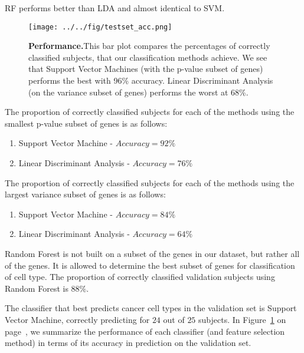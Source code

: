 RF performs better than LDA and almost identical to SVM.

\begin{figure}[H]
  \centering
    \texttt{[image: ../../fig/testset\_acc.png]}
\caption{\textbf{Performance.}This bar plot compares the percentages of correctly
  classified subjects, that our classification methods achieve. We see that
  Support Vector Machines (with the p-value subset of genes) performs the best
  with 96\% accuracy. Linear Discriminant Analysis (on the variance subset of
  genes) performs the worst at 68\%.}
   \label{fig:performance}
\end{figure}

The proportion of correctly classified subjects for each of the methods using
the smallest p-value subset of genes is as follows:

\begin{enumerate}
\item Support Vector Machine - $Accuracy = 92\%$
\item Linear Discriminant Analysis - $Accuracy = 76\%$
\end{enumerate}

The proportion of correctly classified subjects for each of the methods using
the largest variance subset of genes is as follows:

\begin{enumerate}
\item Support Vector Machine - $Accuracy = 84\% $
\item Linear Discriminant Analysis - $Accuracy =64\% $
\end{enumerate}

Random Forest is not built on a subset of the genes in our dataset, but rather
all of the genes. It is allowed to determine the best subset of genes for
classification of cell type. The proportion of correctly classified validation
subjects using Random Forest is $88\%$.

The classifier that best predicts cancer cell types in the validation set is
Support Vector Machine, correctly predicting for $24$ out of $25$ subjects.
In Figure~\ref{fig:performance} on page~\pageref{fig:performance}, we
summarize the performance of each classifier (and feature selection
method) in terms of its accuracy in prediction on the validation set.


